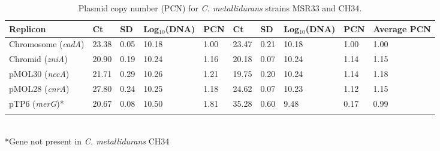 \begin{table}
\caption{Plasmid copy number (PCN) for \textit{C. metallidurans} strains MSR33 and CH34.\\}
\label{table:47}%
{%
\begin{tabular*}{\columnwidth}{@{}llllllllll@{}}
\hline
 \textbf{Replicon} & \textbf{Ct} & \textbf{SD} & \textbf{Log$_{10}$(DNA)} & \textbf{PCN}  & \textbf{Ct} & \textbf{SD} & \textbf{Log$_{10}$(DNA)} & \textbf{PCN} & \textbf{Average PCN}\\
 \hline
Chromosome (\textit{cadA}) & 23.38 & 0.05 & 10.18 & 1.00 & 23.47 & 0.21 & 10.18 & 1.00  & 1.00\\
Chromid (\textit{zniA}) & 20.90 & 0.19 & 10.24 & 1.16 & 20.18 & 0.07 & 10.24 & 1.14  & 1.15\\
pMOL30 (\textit{nccA}) & 21.71 & 0.29 & 10.26 & 1.21 & 19.75 & 0.20 & 10.24 & 1.14  & 1.18\\
pMOL28 (\textit{cnrA}) & 27.80 & 0.24 & 10.25 & 1.18 & 24.62 & 0.07 & 10.23 & 1.12  & 1.15\\
pTP6 (\textit{merG})* & 20.67 & 0.08 & 10.50 & 1.81 & 35.28 & 0.60 & 9.48 & 0.17  & 0.99\\
\\
\hline
\hline
\end{tabular*}
}
\\
{
\footnotesize{*Gene not present in \textit{C. metallidurans} CH34}
}
\end{table}

